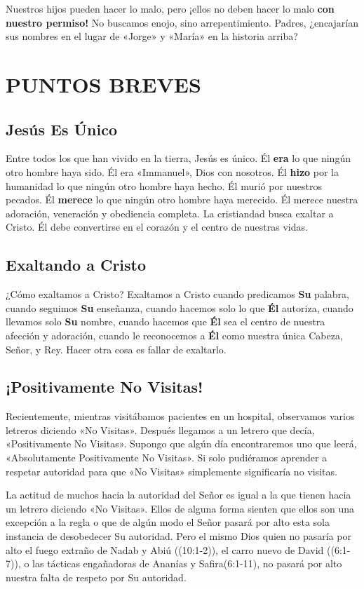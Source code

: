 \documentclass[12pt, twoside, openright]{book}
\begin{document}
Nuestros hijos pueden hacer lo malo, pero ¡ellos no deben hacer lo malo \textbf{con nuestro permiso!} No buscamos enojo, sino arrepentimiento. Padres, ¿encajarían sus nombres en el lugar de «Jorge» y «María» en la historia arriba?

\chapter{PUNTOS BREVES}
\section{Jesús Es Único}
Entre todos los que han vivido en la tierra, Jesús es único. Él \textbf{era} lo que ningún otro hombre haya sido. Él era «Immanuel», Dios con nosotros. Él \textbf{hizo} por la humanidad lo que ningún otro hombre haya hecho. Él murió por nuestros pecados. Él \textbf{merece} lo que ningún otro hombre haya merecido. Él merece nuestra adoración, veneración y obediencia completa. La cristiandad busca exaltar a Cristo. Él debe convertirse en el corazón y el centro de nuestras vidas.

\section{Exaltando a Cristo}
¿Cómo exaltamos a Cristo? Exaltamos a Cristo cuando predicamos \textbf{Su} palabra, cuando seguimos \textbf{Su} enseñanza, cuando hacemos solo lo que \textbf{Él} autoriza, cuando llevamos solo \textbf{Su} nombre, cuando hacemos que \textbf{Él} sea el centro de nuestra afección y adoración, cuando le reconocemos a \textbf{Él} como nuestra única Cabeza, Señor, y Rey. Hacer otra cosa es fallar de exaltarlo.

\section{¡Positivamente No Visitas!}
Recientemente, mientras visitábamos pacientes en un hospital, observamos varios letreros diciendo «No Visitas». Después llegamos a un letrero que decía, «Positivamente No Visitas». Supongo que algún día encontraremos uno que leerá, «Absolutamente Positivamente No Visitas». Si solo pudiéramos aprender a respetar autoridad para que «No Visitas» simplemente significaría no visitas.

La actitud de muchos hacia la autoridad del Señor es igual a la que tienen hacia un letrero diciendo «No Visitas». Ellos de alguna forma sienten que ellos son una excepción a la regla o que de algún modo el Señor pasará por alto esta sola instancia de desobedecer Su autoridad. Pero el mismo Dios quien no pasaría por alto el fuego extraño de Nadab y Abiú ((10:1-2)), el carro nuevo de David ((6:1-7)), o las tácticas engañadoras de Ananías y Safira(6:1-11), no pasará por alto nuestra falta de respeto por Su autoridad.
\end{document}
